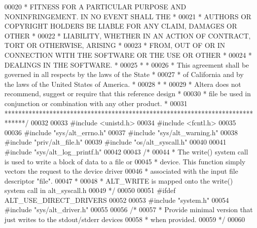 \begin{DoxyCode}
00020 \textcolor{comment}{* FITNESS FOR A PARTICULAR PURPOSE AND NONINFRINGEMENT. IN NO EVENT SHALL THE *}
00021 \textcolor{comment}{* AUTHORS OR COPYRIGHT HOLDERS BE LIABLE FOR ANY CLAIM, DAMAGES OR OTHER      *}
00022 \textcolor{comment}{* LIABILITY, WHETHER IN AN ACTION OF CONTRACT, TORT OR OTHERWISE, ARISING     *}
00023 \textcolor{comment}{* FROM, OUT OF OR IN CONNECTION WITH THE SOFTWARE OR THE USE OR OTHER         *}
00024 \textcolor{comment}{* DEALINGS IN THE SOFTWARE.                                                   *}
00025 \textcolor{comment}{*                                                                             *}
00026 \textcolor{comment}{* This agreement shall be governed in all respects by the laws of the State   *}
00027 \textcolor{comment}{* of California and by the laws of the United States of America.              *}
00028 \textcolor{comment}{*                                                                             *}
00029 \textcolor{comment}{* Altera does not recommend, suggest or require that this reference design    *}
00030 \textcolor{comment}{* file be used in conjunction or combination with any other product.          *}
00031 \textcolor{comment}{******************************************************************************/}
00032 
00033 \textcolor{preprocessor}{#include <unistd.h>}
00034 \textcolor{preprocessor}{#include <fcntl.h>}
00035 
00036 \textcolor{preprocessor}{#include "sys/alt_errno.h"}
00037 \textcolor{preprocessor}{#include "sys/alt_warning.h"}
00038 \textcolor{preprocessor}{#include "priv/alt_file.h"}
00039 \textcolor{preprocessor}{#include "os/alt_syscall.h"}
00040 
00041 \textcolor{preprocessor}{#include "sys/alt_log_printf.h"}
00042 
00043 \textcolor{comment}{/*}
00044 \textcolor{comment}{ * The write() system call is used to write a block of data to a file or }
00045 \textcolor{comment}{ * device. This function simply vectors the request to the device driver }
00046 \textcolor{comment}{ * associated with the input file descriptor "file". }
00047 \textcolor{comment}{ *}
00048 \textcolor{comment}{ * ALT\_WRITE is mapped onto the write() system call in alt\_syscall.h}
00049 \textcolor{comment}{ */}
00050  
00051 \textcolor{preprocessor}{#ifdef ALT\_USE\_DIRECT\_DRIVERS}
00052 
00053 \textcolor{preprocessor}{#include "system.h"}
00054 \textcolor{preprocessor}{#include "sys/alt_driver.h"}
00055 
00056 \textcolor{comment}{/*}
00057 \textcolor{comment}{ * Provide minimal version that just writes to the stdout/stderr devices}
00058 \textcolor{comment}{ * when provided.}
00059 \textcolor{comment}{ */}
00060 

\end{DoxyCode}
